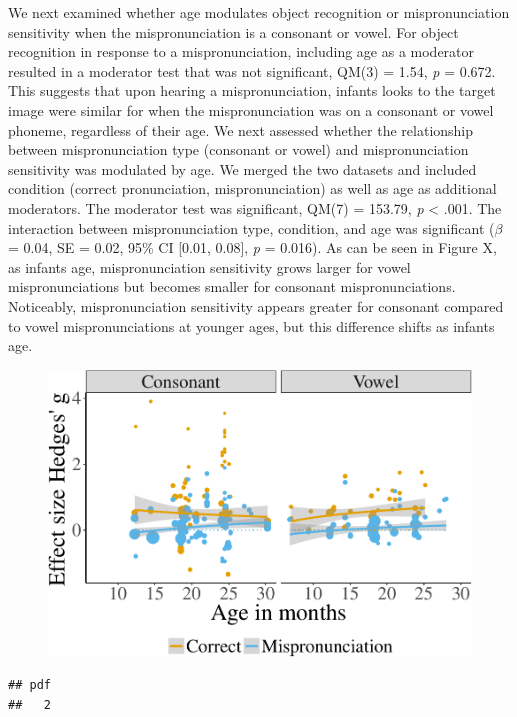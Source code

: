 \documentclass[man]{apa6}
\theoremstyle{definition}
\theoremstyle{definition}
\theoremstyle{definition}
\theoremstyle{remark}
\begin{document}
We next examined whether age modulates object recognition or
mispronunciation sensitivity when the mispronunciation is a consonant or
vowel. For object recognition in response to a mispronunciation,
including age as a moderator resulted in a moderator test that was not
significant, QM(3) = 1.54, \emph{p} = 0.672. This suggests that upon
hearing a mispronunciation, infants looks to the target image were
similar for when the mispronunciation was on a consonant or vowel
phoneme, regardless of their age. We next assessed whether the
relationship between mispronunciation type (consonant or vowel) and
mispronunciation sensitivity was modulated by age. We merged the two
datasets and included condition (correct pronunciation,
mispronunciation) as well as age as additional moderators. The moderator
test was significant, QM(7) = 153.79, \emph{p} \textless{} .001. The
interaction between mispronunciation type, condition, and age was
significant (\(\beta\) = 0.04, SE = 0.02, 95\% CI {[}0.01, 0.08{]},
\emph{p} = 0.016). As can be seen in Figure X, as infants age,
mispronunciation sensitivity grows larger for vowel mispronunciations
but becomes smaller for consonant mispronunciations. Noticeably,
mispronunciation sensitivity appears greater for consonant compared to
vowel mispronunciations at younger ages, but this difference shifts as
infants age.

\begin{figure}[htbp]
\centering
\includegraphics{Paper_Analyses_files/figure-latex/PlotCVEffect_cond_age-1.pdf}
\caption{}
\end{figure}

\begin{verbatim}
## pdf 
##   2
\end{verbatim}
\end{document}
